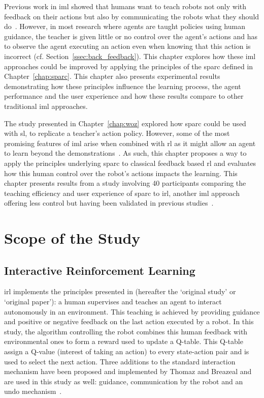 Previous work in \gls{iml} showed that humans want to teach robots not only with feedback on their actions but also by communicating the robots what they should do~\citep{thomaz2008teachable,amershi2014power}. However, in most research where agents are taught policies using human guidance, the teacher is given little or no control over the agent's actions and has to observe the agent executing an action even when knowing that this action is incorrect (cf. Section~\ref{ssec:back_feedback}). This chapter explores how these \gls{iml} approaches could be improved by applying the principles of the \gls{sparc} defined in Chapter~\ref{chap:sparc}. This chapter also presents experimental results demonstrating how these principles influence the learning process, the agent performance and the user experience and how these results compare to other traditional \gls{iml} approaches.

The study presented in Chapter~\ref{chap:woz} explored how \gls{sparc} could be used with \acrlong{sl}, to replicate a teacher's action policy. However, some of the most promising features of \gls{iml} arise when combined with \gls{rl} as it might allow an agent to learn beyond the demonstrations~\citep{abbeel2004apprenticeship}. As such, this chapter proposes a way to apply the principles underlying \gls{sparc} to classical feedback based \gls{rl} and evaluates how this human control over the robot's actions impacts the learning. This chapter presents results from a study involving 40 participants comparing the teaching efficiency and user experience of \gls{sparc} to \gls{irl}, another \gls{iml} approach offering less control but having been validated in previous studies~\citep{thomaz2008teachable}. %

\section{Scope of the Study}


\subsection{Interactive Reinforcement Learning}

\gls{irl} implements the principles presented in \cite{thomaz2008teachable}(hereafter the `original study' or `original paper'): a human supervises and teaches an agent to interact autonomously in an environment. This teaching is achieved by providing guidance and positive or negative feedback on the last action executed by a robot. In this study, the algorithm controlling the robot combines this human feedback with environmental ones to form a reward used to update a Q-table. This Q-table assign a Q-value (interest of taking an action) to every state-action pair and is used to select the next action. Three additions to the standard interaction mechanism have been proposed and implemented by Thomaz and Breazeal and are used in this study as well: guidance, communication by the robot and an undo mechanism~\citep{thomaz2008teachable}. 

